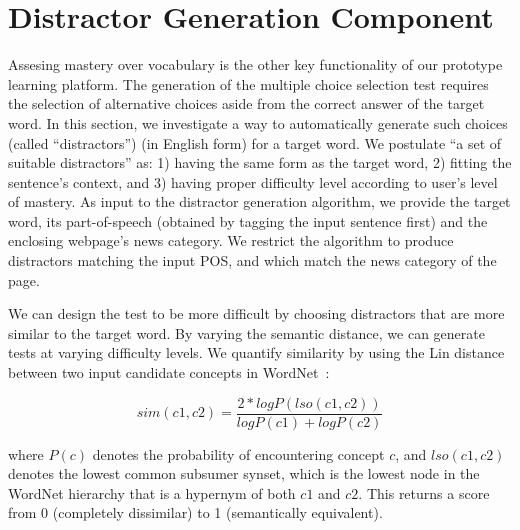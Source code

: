 \section{Distractor Generation Component}
\label{sec:distractor}

Assesing mastery over vocabulary is the other key functionality of our
prototype learning platform.  The generation of the multiple choice
selection test requires the selection of alternative choices aside
from the correct answer of the target word.  In this section, we
investigate a way to automatically generate such choices (called
``distractors'') (in English form) for a target word. We postulate ``a
set of suitable distractors'' as: 1) having the same form as the
target word, 2) fitting the sentence's context, and 3) having proper
difficulty level according to user's level of mastery.
As input to the distractor generation algorithm, we provide the target
word, its part-of-speech (obtained by tagging the input sentence
first) and the enclosing webpage's news category. We restrict the
algorithm to produce distractors matching the input POS, and which
match the news category of the page.


We can design the test to be more difficult by choosing distractors
that are more similar to the target word.  By varying the semantic
distance, we can generate tests at varying difficulty levels.  We
quantify similarity by using the Lin distance~\cite{Lin1998} between two
input candidate concepts in WordNet~\cite{Miller1995}:

\begin{equation}
sim(c1,c2) = \frac{2*log P(lso(c1,c2))}{log P(c1)+log P(c2)}
\label{equation:Distractor_4}
\end{equation}  

\noindent where $P(c)$ denotes the probability of encountering concept
$c$, and $lso(c1,c2)$ denotes the lowest common subsumer synset, which
is the lowest node in the WordNet hierarchy that is a hypernym of both
$c1$ and $c2$.  This returns a score from 0 (completely dissimilar) to
1 (semantically equivalent).

